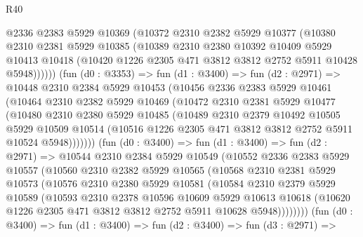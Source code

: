 \begin{lexlean}{R40}
\begin{coremodule}
            @2336
            @2383
            @5929
            @10369
            (@10372
              @2310
              @2382
              @5929
              @10377
              (@10380
                @2310
                @2381
                @5929
                @10385
                (@10389
                  @2310
                  @2380
                  @10392
                  @10409
                  @5929
                  @10413
                  @10418
                  (@10420 @1226 @2305 @471 @3812 @3812 @2752 @5911 @10428 @5948))))))
        (fun (d0 : @3353) =>
        fun (d1 : @3400) =>
        fun (d2 : @2971) =>
        @10448
          @2310
          @2384
          @5929
          @10453
          (@10456
            @2336
            @2383
            @5929
            @10461
            (@10464
              @2310
              @2382
              @5929
              @10469
              (@10472
                @2310
                @2381
                @5929
                @10477
                (@10480
                  @2310
                  @2380
                  @5929
                  @10485
                  (@10489
                    @2310
                    @2379
                    @10492
                    @10505
                    @5929
                    @10509
                    @10514
                    (@10516 @1226 @2305 @471 @3812 @3812 @2752 @5911 @10524 @5948)))))))
        (fun (d0 : @3400) =>
        fun (d1 : @3400) =>
        fun (d2 : @2971) =>
        @10544
          @2310
          @2384
          @5929
          @10549
          (@10552
            @2336
            @2383
            @5929
            @10557
            (@10560
              @2310
              @2382
              @5929
              @10565
              (@10568
                @2310
                @2381
                @5929
                @10573
                (@10576
                  @2310
                  @2380
                  @5929
                  @10581
                  (@10584
                    @2310
                    @2379
                    @5929
                    @10589
                    (@10593
                      @2310
                      @2378
                      @10596
                      @10609
                      @5929
                      @10613
                      @10618
                      (@10620 @1226 @2305 @471 @3812 @3812 @2752 @5911 @10628 @5948))))))))
        (fun (d0 : @3400) =>
        fun (d1 : @3400) =>
        fun (d2 : @3400) =>
        fun (d3 : @2971) =>

\end{coremodule}
\end{lexlean}
